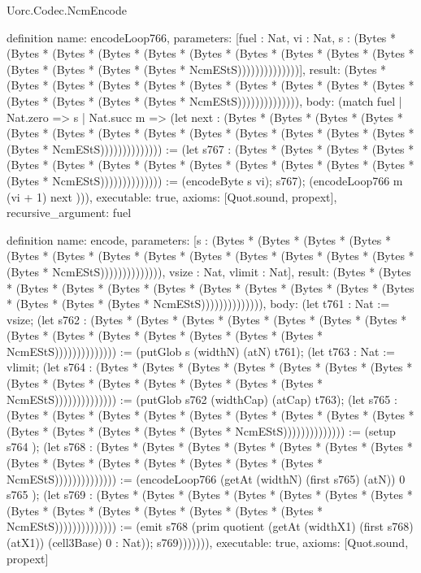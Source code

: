 \begin{lexlean}{Uorc.Codec.NcmEncode}
\begin{semanticmodule}
definition{
  name: encodeLoop766,
  parameters: [fuel : Nat, vi : Nat, s : (Bytes * (Bytes * (Bytes * (Bytes * (Bytes * (Bytes * (Bytes * (Bytes * (Bytes * (Bytes * (Bytes * (Bytes * (Bytes * (Bytes * NcmEStS))))))))))))))],
  result: (Bytes * (Bytes * (Bytes * (Bytes * (Bytes * (Bytes * (Bytes * (Bytes * (Bytes * (Bytes * (Bytes * (Bytes * (Bytes * (Bytes * NcmEStS)))))))))))))),
  body: (match fuel
    | Nat.zero => s
    | Nat.succ m => (let next : (Bytes * (Bytes * (Bytes * (Bytes * (Bytes * (Bytes * (Bytes * (Bytes * (Bytes * (Bytes * (Bytes * (Bytes * (Bytes * (Bytes * NcmEStS)))))))))))))) := (let s767 : (Bytes * (Bytes * (Bytes * (Bytes * (Bytes * (Bytes * (Bytes * (Bytes * (Bytes * (Bytes * (Bytes * (Bytes * (Bytes * (Bytes * NcmEStS)))))))))))))) := (encodeByte s vi); s767); (encodeLoop766 m (vi + 1) next ))),
  executable: true,
  axioms: [Quot.sound, propext],
  recursive_argument: fuel
}

definition{
  name: encode,
  parameters: [s : (Bytes * (Bytes * (Bytes * (Bytes * (Bytes * (Bytes * (Bytes * (Bytes * (Bytes * (Bytes * (Bytes * (Bytes * (Bytes * (Bytes * NcmEStS)))))))))))))), vsize : Nat, vlimit : Nat],
  result: (Bytes * (Bytes * (Bytes * (Bytes * (Bytes * (Bytes * (Bytes * (Bytes * (Bytes * (Bytes * (Bytes * (Bytes * (Bytes * (Bytes * NcmEStS)))))))))))))),
  body: (let t761 : Nat := vsize; (let s762 : (Bytes * (Bytes * (Bytes * (Bytes * (Bytes * (Bytes * (Bytes * (Bytes * (Bytes * (Bytes * (Bytes * (Bytes * (Bytes * (Bytes * NcmEStS)))))))))))))) := (putGlob s (widthN) (atN) t761); (let t763 : Nat := vlimit; (let s764 : (Bytes * (Bytes * (Bytes * (Bytes * (Bytes * (Bytes * (Bytes * (Bytes * (Bytes * (Bytes * (Bytes * (Bytes * (Bytes * (Bytes * NcmEStS)))))))))))))) := (putGlob s762 (widthCap) (atCap) t763); (let s765 : (Bytes * (Bytes * (Bytes * (Bytes * (Bytes * (Bytes * (Bytes * (Bytes * (Bytes * (Bytes * (Bytes * (Bytes * (Bytes * (Bytes * NcmEStS)))))))))))))) := (setup s764 ); (let s768 : (Bytes * (Bytes * (Bytes * (Bytes * (Bytes * (Bytes * (Bytes * (Bytes * (Bytes * (Bytes * (Bytes * (Bytes * (Bytes * (Bytes * NcmEStS)))))))))))))) := (encodeLoop766 (getAt (widthN) (first s765) (atN)) 0 s765 ); (let s769 : (Bytes * (Bytes * (Bytes * (Bytes * (Bytes * (Bytes * (Bytes * (Bytes * (Bytes * (Bytes * (Bytes * (Bytes * (Bytes * (Bytes * NcmEStS)))))))))))))) := (emit s768 (prim quotient (getAt (widthX1) (first s768) (atX1)) (cell3Base) 0 : Nat)); s769))))))),
  executable: true,
  axioms: [Quot.sound, propext]
}


\end{semanticmodule}
\end{lexlean}
